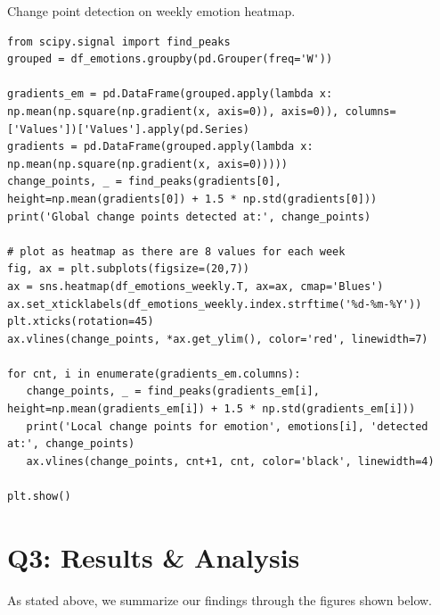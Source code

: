 \begin{listing*}
\caption{Change point detection on weekly emotion heatmap.}
\begin{verbatim}
from scipy.signal import find_peaks
grouped = df_emotions.groupby(pd.Grouper(freq='W'))

gradients_em = pd.DataFrame(grouped.apply(lambda x: np.mean(np.square(np.gradient(x, axis=0)), axis=0)), columns=['Values'])['Values'].apply(pd.Series)
gradients = pd.DataFrame(grouped.apply(lambda x: np.mean(np.square(np.gradient(x, axis=0)))))
change_points, _ = find_peaks(gradients[0], height=np.mean(gradients[0]) + 1.5 * np.std(gradients[0]))
print('Global change points detected at:', change_points)

# plot as heatmap as there are 8 values for each week
fig, ax = plt.subplots(figsize=(20,7))
ax = sns.heatmap(df_emotions_weekly.T, ax=ax, cmap='Blues')
ax.set_xticklabels(df_emotions_weekly.index.strftime('%d-%m-%Y'))
plt.xticks(rotation=45)
ax.vlines(change_points, *ax.get_ylim(), color='red', linewidth=7)

for cnt, i in enumerate(gradients_em.columns):
   change_points, _ = find_peaks(gradients_em[i], height=np.mean(gradients_em[i]) + 1.5 * np.std(gradients_em[i]))
   print('Local change points for emotion', emotions[i], 'detected at:', change_points)
   ax.vlines(change_points, cnt+1, cnt, color='black', linewidth=4)

plt.show()
\end{verbatim}
\label{listing:p3-listing5}
\end{listing*}


\section*{Q3: Results \& Analysis}
As stated above, we summarize our findings through the figures shown below.

